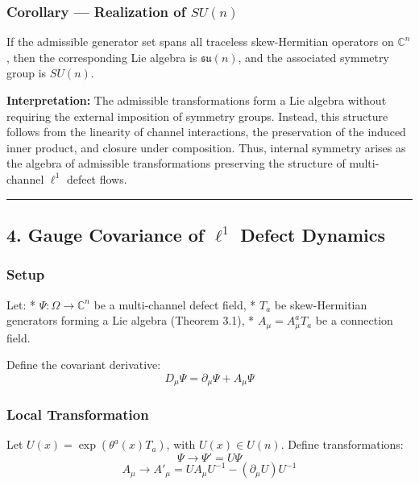 \documentclass[
]{article}
\begin{document}
\subsubsection{\texorpdfstring{Corollary --- Realization of
\(SU(n)\)}{Corollary --- Realization of SU(n)}}\label{corollary-realization-of-sun}

If the admissible generator set spans all traceless skew-Hermitian
operators on \(\mathbb{C}^n\), then the corresponding Lie algebra is
\(\mathfrak{su}(n)\), and the associated symmetry group is \(SU(n)\).

\textbf{Interpretation:} The admissible transformations form a Lie
algebra without requiring the external imposition of symmetry groups.
Instead, this structure follows from the linearity of channel
interactions, the preservation of the induced inner product, and closure
under composition. Thus, internal symmetry arises as the algebra of
admissible transformations preserving the structure of multi-channel
\(\ell^1\) defect flows.

\begin{center}\rule{0.5\linewidth}{0.5pt}\end{center}

\subsection{\texorpdfstring{4. Gauge Covariance of \(\ell^1\) Defect
Dynamics}{4. Gauge Covariance of \textbackslash ell\^{}1 Defect Dynamics}}\label{gauge-covariance-of-ell1-defect-dynamics}

\subsubsection{Setup}\label{setup-1}

Let: * \(\Psi : \Omega \to \mathbb{C}^n\) be a multi-channel defect
field, * \(T_a\) be skew-Hermitian generators forming a Lie algebra
(Theorem 3.1), * \(A_\mu = A_\mu^a T_a\) be a connection field.

Define the covariant derivative:
\[ D_\mu \Psi = \partial_\mu \Psi + A_\mu \Psi \]

\subsubsection{Local Transformation}\label{local-transformation}

Let \(U(x) = \exp(\theta^a(x) T_a)\), with \(U(x) \in U(n)\). Define
transformations: \[ \Psi \rightarrow \Psi' = U \Psi \]
\[ A_\mu \rightarrow A'_\mu = U A_\mu U^{-1} - (\partial_\mu U) U^{-1} \]
\end{document}

